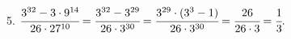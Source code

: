 5. $\cfrac{3^{32}-3\cdot 9^{14}}{26\cdot27^{10}}=\cfrac{3^{32}-3^{29}}{26\cdot3^{30}}=\cfrac{3^{29}\cdot(3^3-1)}{26\cdot3^{30}}=\cfrac{26}{26\cdot3}=\cfrac{1}{3}.$\\
